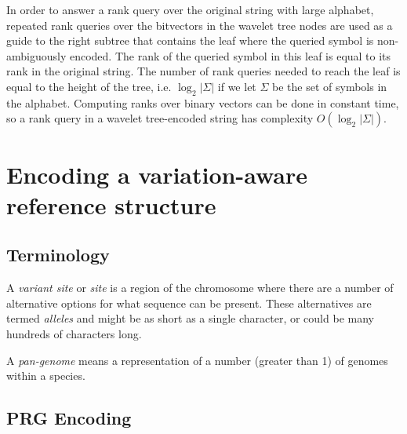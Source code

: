 \documentclass[runningheads,a4paper]{llncs}
\begin{document}
In order to answer a rank query over the original string with large alphabet, repeated rank queries over the bitvectors in the wavelet tree nodes are used as a guide to the right subtree that contains the leaf where the queried symbol is non-ambiguously encoded. The rank of the queried symbol in this leaf is equal to its rank in the original string. The number of rank queries needed to reach the leaf is equal to the height of the tree, i.e. $\log_{2} {|\Sigma|}$ if we let $\Sigma$ be the set of symbols in the alphabet. Computing ranks over binary vectors can be done in constant time, so a rank query in a wavelet tree-encoded string has complexity $O(\log_{2} {|\Sigma|})$. 

\section{Encoding a variation-aware reference structure}

\subsection{Terminology}
A \textit{variant site} or \textit{site} is a region of the chromosome where there are a number of alternative options for what sequence can be present.
These alternatives are termed \textit{alleles} and might be as short as a single character, or could be many hundreds of characters long. 

A  \textit{pan-genome} means a representation of a number (greater than 1) of genomes within a species. 

\subsection{PRG Encoding}
\end{document}
